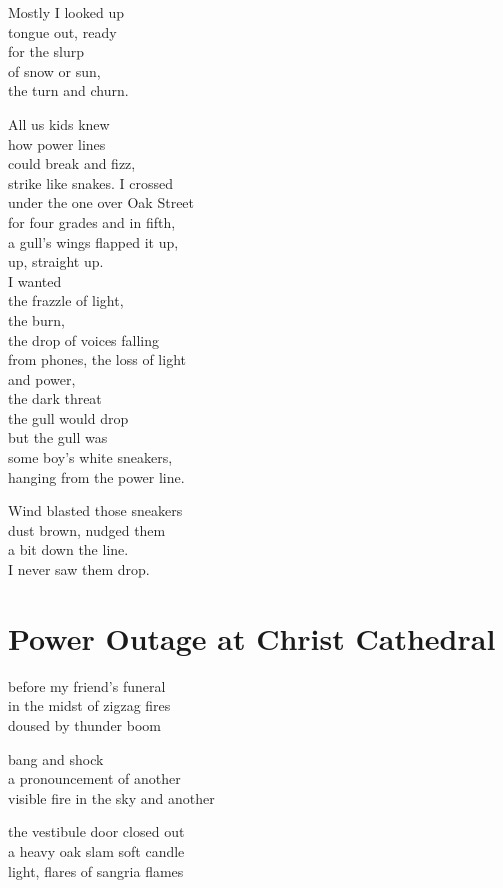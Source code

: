 \documentclass[twoside,10pt]{book}
\begin{document}
Mostly I looked up\\
tongue out, ready\\
for the slurp\\
of snow or sun,\\
the turn and churn.

All us kids knew\\
how power lines\\
could break and fizz,\\
strike like snakes. I crossed\\
under the one over Oak Street\\
for four grades and in fifth,\\
a gull's wings flapped it up,\\
up, straight up.\\
I wanted\\
the frazzle of light,\\
the burn,\\
the drop of voices falling\\
from phones, the loss of light\\
and power,\\
the dark threat\\
the gull would drop\\
but the gull was\\
some boy's white sneakers,\\
hanging from the power line.

Wind blasted those sneakers\\
dust brown, nudged them\\
a bit down the line.\\
I never saw them drop.


\clearpage
\section{Power Outage at Christ Cathedral}

before my friend's funeral\\
in the midst of zigzag fires\\
doused by thunder boom

bang and shock\\
a pronouncement of another\\
visible fire in the sky and another

the vestibule door closed out\\
a heavy oak slam soft candle\\
light, flares of sangria flames
\end{document}
